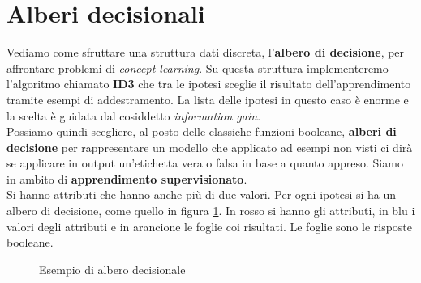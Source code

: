 \section{Alberi decisionali}
Vediamo come sfruttare una struttura dati discreta, l'\textbf{albero di
  decisione}, per affrontare problemi di \textit{concept learning}. Su questa
struttura implementeremo l'algoritmo chiamato \textbf{ID3} che tra le ipotesi
sceglie il risultato dell'apprendimento tramite esempi di addestramento. La
lista delle ipotesi in questo caso è enorme e la scelta è guidata dal cosiddetto
\textit{information gain}.\\
Possiamo quindi scegliere, al posto delle classiche funzioni booleane,
\textbf{alberi di decisione} per rappresentare un modello che applicato ad
esempi non visti ci dirà se applicare in output un'etichetta vera o falsa in
base a quanto appreso. Siamo in ambito di \textbf{apprendimento
  supervisionato}.\\
Si hanno attributi che hanno anche più di due valori. Per ogni ipotesi si ha un
albero di decisione, come quello in figura \ref{dt}. In rosso si hanno gli
attributi, in blu i valori degli attributi e in arancione le foglie coi
risultati. Le foglie sono le risposte booleane.\\
\begin{figure}
  \centering
  \caption{Esempio di albero decisionale}
  \label{dt}
\end{figure}

